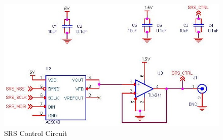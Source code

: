 \begin{figure}
\includegraphics[keepaspectratio=true,width=6in]{./figures/board/srsCtrl.jpg}
\centering
\caption{SRS Control Circuit}
\label{srsCtrl}
\end{figure}
